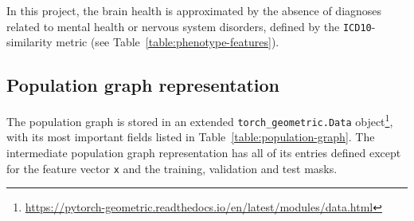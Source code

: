 In this project, the brain health is approximated by the absence of diagnoses related to mental health or nervous system disorders, defined by the \texttt{ICD10}-similarity metric (see Table~\ref{table:phenotype-features}).

\subsection{Population graph representation}
\label{section:population-graph-representation}

The population graph is stored in an extended \texttt{torch\_geometric.Data} object\footnote{\url{https://pytorch-geometric.readthedocs.io/en/latest/modules/data.html}}, with its most important fields listed in Table~\ref{table:population-graph}. The intermediate population graph representation has all of its entries defined except for the feature vector \texttt{x} and the training, validation and test masks.

